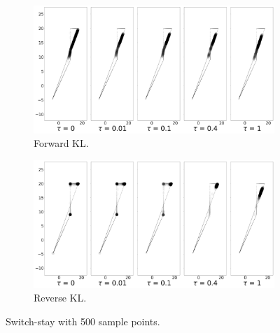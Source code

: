 \documentclass{article}
\begin{document}
\begin{figure}[!htb]
  \centering
  \begin{subfigure}[b]{0.5\linewidth}
    \centering
    \includegraphics[width=0.8\columnwidth]{figs/continuous-switch-stay/monte-carlo/500/polytope_forward_optim=adam_lr=0.005.png}
    \caption{Forward KL.}
    \label{fig:500-sample-switch-stay-forward}
  \end{subfigure}%
  \begin{subfigure}[b]{0.5\linewidth}
        \centering
        \includegraphics[width=0.8\columnwidth]{figs/continuous-switch-stay/monte-carlo/500/polytope_reverse_optim=adam_lr=0.005.png}
        \caption{Reverse KL.}
        \label{fig:500-sample-switch-stay-reverse}
  \end{subfigure}
  \caption{Switch-stay with 500 sample points.}
\end{figure}




\clearpage 


\end{document}
